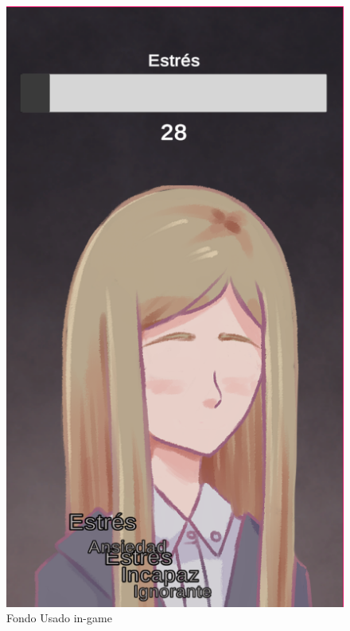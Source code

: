 \begin{figure}[ht]
\begin{minipage}{.5\textwidth}
\begin{minipage}{.45\textwidth}
            \includegraphics[width=\textwidth]{imgs/screenshot03.png}
        \end{minipage}
        \caption{Fondo Usado in-game}
        \label{fig:fondo-generico-in-game}
    \end{minipage}
\end{figure}

